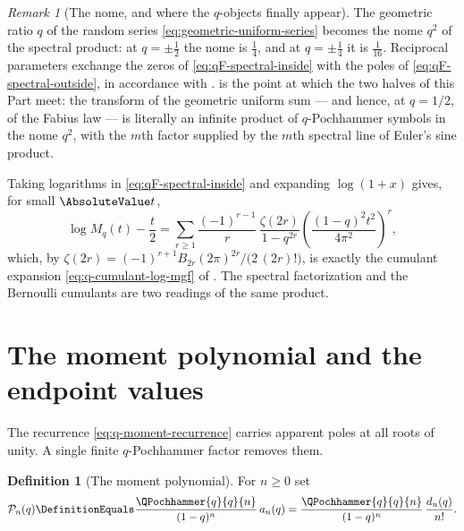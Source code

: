 \documentclass[11pt,a4paper,oneside,openany]{book}
\theoremstyle{definition}
\newtheorem{definition}[definition]{Definition}
\theoremstyle{remark}
\newtheorem{remark}[remark]{Remark}
\begin{document}
\begin{remark}[The nome, and where the $q$-objects finally appear]\label{rem:qF-nome}
The geometric ratio $q$ of the random series \eqref{eq:geometric-uniform-series}
becomes the nome $q^2$ of the spectral product: at $q=\pm\tfrac12$ the nome is
$\tfrac14$, and at $q=\pm\tfrac14$ it is $\tfrac1{16}$.  Reciprocal parameters
exchange the zeros of \eqref{eq:qF-spectral-inside} with the poles of
\eqref{eq:qF-spectral-outside}, in accordance with .
 is the point at which the two halves of this Part meet:
the transform of the geometric uniform sum --- and hence, at $q=1/2$, of the
Fabius law --- is literally an infinite product of $q$-Pochhammer symbols in the
nome $q^2$, with the $m$th factor supplied by the $m$th spectral line of Euler's
sine product.

Taking logarithms in \eqref{eq:qF-spectral-inside} and expanding $\log(1+x)$
gives, for small $\AbsoluteValue t$,
\[
 \log M_q(t)-\frac t2
 =\sum_{r\ge1}\frac{(-1)^{r-1}}{r}\,
   \frac{\zeta(2r)}{1-q^{2r}}\left(\frac{(1-q)^2t^2}{4\pi^2}\right)^{\!r},
\]
which, by $\zeta(2r)=(-1)^{r+1}B_{2r}(2\pi)^{2r}/\bigl(2\,(2r)!\bigr)$, is
exactly the cumulant expansion \eqref{eq:q-cumulant-log-mgf} of
.  The spectral factorization and the Bernoulli
cumulants are two readings of the same product.
\end{remark}


\section{The moment polynomial and the endpoint values}

The recurrence \eqref{eq:q-moment-recurrence} carries apparent poles at all
roots of unity.  A single finite $q$-Pochhammer factor removes them.

\begin{definition}[The moment polynomial]\label{def:qF-moment-polynomial}
For $n\ge0$ set
\begin{equation}\label{eq:qF-moment-polynomial}
 \mathcal P_n(q)\DefinitionEquals\frac{\QPochhammer{q}{q}{n}}{(1-q)^n}\,a_n(q)
 =\frac{\QPochhammer{q}{q}{n}}{(1-q)^n}\,\frac{d_n(q)}{n!}.
\end{equation}
\end{definition}
\end{document}
